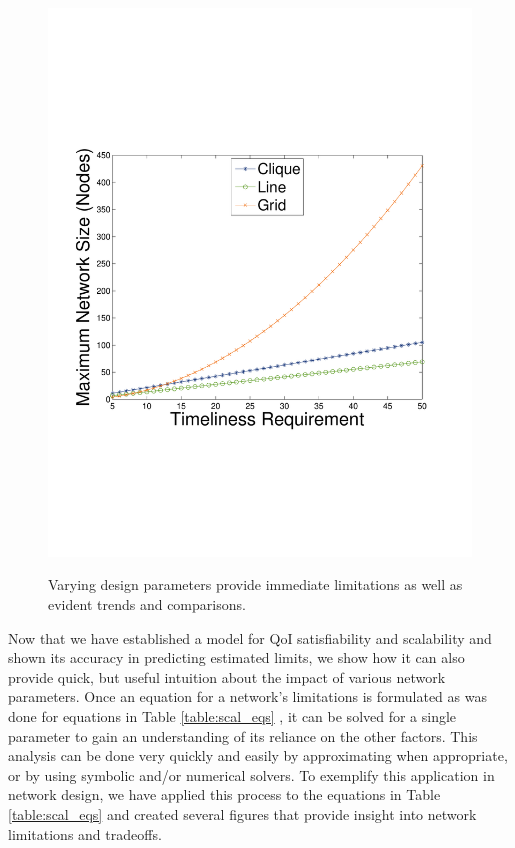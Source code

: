 \begin{figure}
{	\includegraphics[scale=0.22, clip=true, trim=14mm 65mm 25mm 65mm]{figures/use_cases_examples/num_nodes_vs_tness_5_SS_12_IS_color.pdf}
        \label{fig:use_case_num_nodes_vs_qoi_2}
        }
   \vspace{-1mm}
   \caption{Varying design parameters provide immediate limitations as well as evident trends and comparisons.}
   \label{fig:huh_net_design}
   \vspace{-6mm}
\end{figure}
 
Now that we have established a model for QoI satisfiability and scalability and shown its accuracy in predicting estimated limits, we show how it can also provide quick, but useful intuition about the impact of various network parameters.  Once an equation for a network's limitations is formulated as was done for equations in Table \ref{table:scal_eqs} %
, it can be solved for a single parameter to gain an understanding of its reliance on the other factors.  This analysis can be done very quickly and easily by approximating when appropriate, or by using symbolic and/or numerical solvers.  To exemplify this application in network design, we have applied this process to the equations in Table \ref{table:scal_eqs} %
and created several figures that provide insight into network limitations and tradeoffs.

